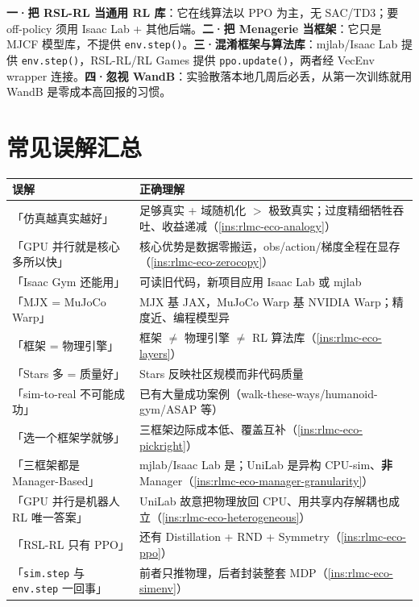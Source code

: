 \begin{pitfall}
\textbf{一·把 RSL-RL 当通用 RL 库}：它在线算法以 PPO 为主，无 SAC/TD3；要 off-policy 须用 Isaac Lab + 其他后端。\textbf{二·把 Menagerie 当框架}：它只是 MJCF 模型库，不提供 \verb|env.step()|。\textbf{三·混淆框架与算法库}：mjlab/Isaac Lab 提供 \verb|env.step()|，RSL-RL/RL Games 提供 \verb|ppo.update()|，两者经 VecEnv wrapper 连接。\textbf{四·忽视 WandB}：实验散落本地几周后必丢，从第一次训练就用 WandB 是零成本高回报的习惯。
\end{pitfall}

\section*{常见误解汇总}
\label{sec:rlmc-eco-misconceptions}

\begin{center}
\small
\begin{tabular}{@{}p{5.4cm}p{8.4cm}@{}}
\toprule
误解 & 正确理解 \\
\midrule
「仿真越真实越好」 & 足够真实 + 域随机化 $>$ 极致真实；过度精细牺牲吞吐、收益递减（\cref{ins:rlmc-eco-analogy}） \\
「GPU 并行就是核心多所以快」 & 核心优势是数据零搬运，obs/action/梯度全程在显存（\cref{ins:rlmc-eco-zerocopy}） \\
「Isaac Gym 还能用」 & 可读旧代码，新项目应用 Isaac Lab 或 mjlab \\
「MJX = MuJoCo Warp」 & MJX 基 JAX，MuJoCo Warp 基 NVIDIA Warp；精度近、编程模型异 \\
「框架 = 物理引擎」 & 框架 $\ne$ 物理引擎 $\ne$ RL 算法库（\cref{ins:rlmc-eco-layers}） \\
「Stars 多 = 质量好」 & Stars 反映社区规模而非代码质量 \\
「sim-to-real 不可能成功」 & 已有大量成功案例（walk-these-ways/humanoid-gym/ASAP 等） \\
「选一个框架学就够」 & 三框架边际成本低、覆盖互补（\cref{ins:rlmc-eco-pickright}） \\
「三框架都是 Manager-Based」 & mjlab/Isaac Lab 是；UniLab 是异构 CPU-sim、\textbf{非} Manager（\cref{ins:rlmc-eco-manager-granularity}） \\
「GPU 并行是机器人 RL 唯一答案」 & UniLab 故意把物理放回 CPU、用共享内存解耦也成立（\cref{ins:rlmc-eco-heterogeneous}） \\
「RSL-RL 只有 PPO」 & 还有 Distillation + RND + Symmetry（\cref{ins:rlmc-eco-ppo}） \\
「\texttt{sim.step} 与 \texttt{env.step} 一回事」 & 前者只推物理，后者封装整套 MDP（\cref{ins:rlmc-eco-simenv}） \\
\bottomrule
\end{tabular}
\end{center}

